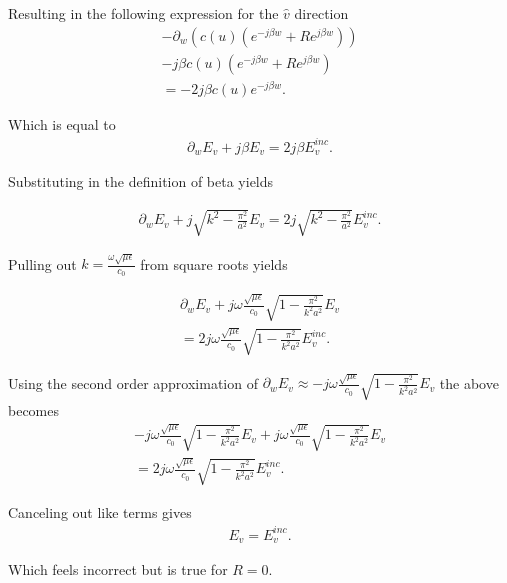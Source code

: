 Resulting in the following expression for the $\hat{v}$ direction
\begin{multline}
    -\partial_w(c(u)(e^{-j\beta w}+Re^{j\beta w})) \\ - j\beta c(u)(e^{-j\beta w}+Re^{j\beta w}) \\ =-2j\beta c(u)e^{-j\beta w}.
\end{multline}

Which is equal to
\begin{align}
    \partial_w E_v+j\beta E_v =2j\beta E_v^{inc}.
\end{align}

Substituting in the definition of beta yields

\begin{align}
    \partial_w E_v+j\sqrt{k^2-\frac{\pi^2}{a^2}} E_v =2j\sqrt{k^2-\frac{\pi^2}{a^2}} E_v^{inc}.
\end{align}

Pulling out $k=\frac{\omega\sqrt{\mu\epsilon}}{c_0}$ from square roots yields

\begin{multline}
    \partial_w E_v+j\omega\frac{\sqrt{\mu\epsilon}}{c_0}\sqrt{1-\frac{\pi^2}{k^2a^2}} E_v \\ =2j\omega\frac{\sqrt{\mu\epsilon}}{c_0}\sqrt{1-\frac{\pi^2}{k^2a^2}} E_v^{inc}.
\end{multline}

Using the second order approximation of $\partial_w E_v\approx-j\omega\frac{\sqrt{\mu\epsilon}}{c_0}\sqrt{1-\frac{\pi^2}{k^2a^2}}E_v$ the above becomes
\begin{multline}
    -j\omega\frac{\sqrt{\mu\epsilon}}{c_0}\sqrt{1-\frac{\pi^2}{k^2a^2}}E_v+j\omega\frac{\sqrt{\mu\epsilon}}{c_0}\sqrt{1-\frac{\pi^2}{k^2a^2}} E_v \\ =2j\omega\frac{\sqrt{\mu\epsilon}}{c_0}\sqrt{1-\frac{\pi^2}{k^2a^2}} E_v^{inc}.
\end{multline}

Canceling out like terms gives
\begin{align}
    E_v = E_v^{inc}.
\end{align}

Which feels incorrect but is true for $R=0$.